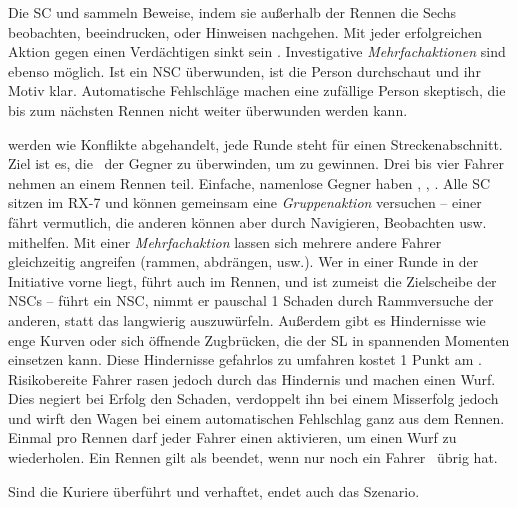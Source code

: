 {	

		\noindent
		Die SC  und sammeln Beweise, indem sie außerhalb der Rennen die Sechs beobachten, beeindrucken, oder Hinweisen nachgehen. Mit jeder erfolgreichen Aktion gegen einen Verdächtigen sinkt sein \HD. Investigative \emph{Mehrfachaktionen} sind ebenso möglich. Ist ein NSC überwunden, ist die Person durchschaut und ihr Motiv klar. Automatische Fehlschläge machen eine zufällige Person skeptisch, die bis zum nächsten Rennen nicht weiter überwunden werden kann.

		 werden wie Konflikte abgehandelt, jede Runde steht für einen Streckenabschnitt. Ziel ist es, die \HD\ der Gegner zu überwinden, um zu gewinnen. Drei bis vier Fahrer nehmen an einem Rennen teil. Einfache, namenlose Gegner haben , , . Alle SC sitzen im RX-7 und können gemeinsam eine \emph{Gruppenaktion} versuchen -- einer fährt vermutlich, die anderen können aber durch Navigieren, Beobachten usw. mithelfen. Mit einer \emph{Mehrfachaktion} lassen sich mehrere andere Fahrer gleichzeitig angreifen (rammen, abdrängen, usw.). Wer in einer Runde in der Initiative vorne liegt, führt auch im Rennen, und ist zumeist die Zielscheibe der NSCs -- führt ein NSC, nimmt er pauschal 1 Schaden durch Rammversuche der anderen, statt das langwierig auszuwürfeln. Außerdem gibt es Hindernisse wie enge Kurven oder sich öffnende Zugbrücken, die der SL in spannenden Momenten einsetzen kann. Diese Hindernisse gefahrlos zu umfahren kostet 1 Punkt am \HD. Risikobereite Fahrer rasen jedoch durch das Hindernis und machen einen Wurf. Dies negiert bei Erfolg den Schaden, verdoppelt ihn bei einem Misserfolg jedoch und wirft den Wagen bei einem automatischen Fehlschlag ganz aus dem Rennen. Einmal pro Rennen darf jeder Fahrer einen  aktivieren, um einen Wurf zu wiederholen. Ein Rennen gilt als beendet, wenn nur noch ein Fahrer \HD\ übrig hat.


		\noindent
		Sind die Kuriere überführt und verhaftet, endet auch das Szenario.

}

